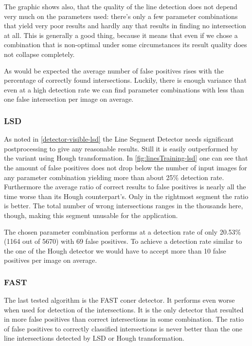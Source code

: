 	The graphic shows also, that the quality of the line detection does not depend very much on the parameters used: there's only a few parameter combinations that yield very poor results and hardly any that results in finding no intersection at all. This is generally a good thing, because it means that even if we chose a combination that is non-optimal under some circumstances its result quality does not collapse completely.

	As would be expected the average number of false positives rises with the percentage of correctly found intersections. Luckily, there is enough variance that even at a high detection rate we can find parameter combinations with less than one false intersection per image on average.

	\subsubsection{LSD}
	\label{evaluation-visible-optimization-lsd}
	As noted in \autoref{detector-visible-lsd} the Line Segment Detector needs significant postprocessing to give any reasonable results. Still it is easily outperformed by the variant using Hough transformation. In \autoref{fig:linesTraining-lsd} one can see that the amount of false positives does not drop below the number of input images for any parameter combination yielding more than about 25\% detection rate. Furthermore the average ratio of correct results to false positives is nearly all the time worse than its Hough counterpart's. Only in the rightmost segment the ratio is better. The total number of wrong intersections ranges in the thousands here, though, making this segment unusable for the application.

	The chosen parameter combination performs at a detection rate of only 20.53\% (1164 out of 5670) with 69 false positives. To achieve a detection rate similar to the one of the Hough detector we would have to accept more than 10 false positives per image on average.

	\subsubsection{FAST}
	\label{evaluation-visible-optimization-fast}
	The last tested algorithm is the FAST coner detector. It performs even worse when used for detection of the intersections. It is the only detector that resulted in more false positives than correct intersections in some combination. The ratio of false positives to correctly classified intersections is never better than the one line intersections detected by LSD or Hough transformation.

